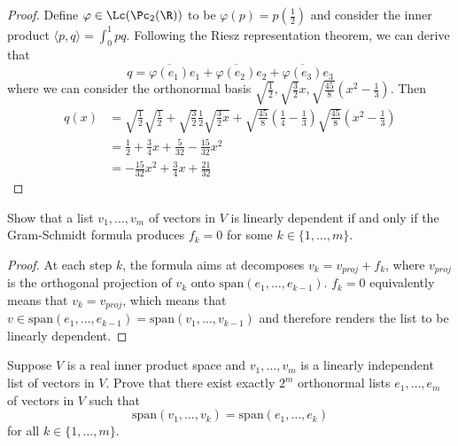 \documentclass{extarticle}
\begin{document}
\begin{proof}
Define \(\varphi \in \Lc(\Pc_2(\R))\) to be \(\varphi(p) = p(\frac{1}{2})\) and consider the inner
product \(\langle p,q \rangle = \int_{0}^{1} pq\). Following the Riesz representation theorem, we
can derive that
\[q =  \overline{\varphi(e_1)}e_1 + \overline{\varphi(e_2)}e_2 + \overline{\varphi(e_3)}e_3\]
where we can consider the orthonormal basis \(\sqrt{\frac{1}{2}}, \sqrt{\frac{3}{2}}x,
\sqrt{\frac{45}{8}}(x^2 - \frac{1}{3})\). Then
\begin{align*}
    q(x) &= \sqrt{\frac{1}{2}} \sqrt{\frac{1}{2}}  + \sqrt{\frac{3}{2}} \frac{1}{2} \sqrt{\frac{3}{2}x}
    + \sqrt{\frac{45}{8}}\left(\frac{1}{4} - \frac{1}{3}\right) \sqrt{\frac{45}{8}} \left(x^2 - \frac{1}{3}\right) \\
    &= \frac{1}{2} + \frac{3}{4}x + \frac{5}{32} - \frac{15}{32}x^2 \\
    &= -\frac{15}{32}x^2 + \frac{3}{4}x + \frac{21}{32}
\end{align*}
\end{proof}

\begin{problem}{13}
    Show that a list \(v_1, \ldots, v_m\) of vectors in \(V\) is linearly dependent if and only if
    the Gram-Schmidt formula produces \(f_k = 0\) for some \(k \in \{1, \ldots, m\}\).
\end{problem}

\begin{proof}
At each step \(k\), the formula aims at decomposes \(v_k = v_{proj} + f_k\), where \(v_{proj}\) is the
orthogonal projection of \(v_k\) onto \(\text{span}(e_1, \ldots, e_{k-1})\). \(f_k = 0\) equivalently
means that \(v_k = v_{proj}\), which means that \(v \in \text{span}(e_1, \ldots, e_{k-1})
= \text{span}(v_1, \ldots, v_{k-1})\) and therefore renders the list to be linearly dependent.
\end{proof}

\begin{problem}{14}
    Suppose \(V\) is a real inner product space and \(v_1, \ldots, v_m\) is a linearly independent list of
    vectors in \(V\). Prove that there exist exactly \(2^m\) orthonormal lists \(e_1, \ldots, e_m\) of
    vectors in \(V\) such that
    \[\text{span}(v_1, \ldots, v_k)  = \text{span}(e_1, \ldots, e_k)\]
    for all \(k \in \{1, \ldots, m\}\).
\end{problem}
\end{document}

